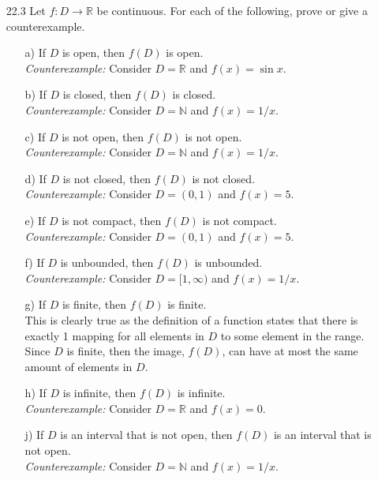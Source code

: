 \documentclass[12pt]{article}
\begin{document}
\begin{enumerate}
\item[22.3] Let $f: D \rightarrow \mathbb{R}$ be continuous. For each of the following, prove or give a counterexample.
\begin{enumerate}
\item[a)] If $D$ is open, then $f(D)$ is open. \\
\emph{Counterexample:} Consider $D = \mathbb{R}$ and $f(x) = \sin x$.
\item[b)] If $D$ is closed, then $f(D)$ is closed. \\
\emph{Counterexample:} Consider $D = \mathbb{N}$ and $f(x) = 1/x$.
\item[c)] If $D$ is not open, then $f(D)$ is not open. \\
\emph{Counterexample:} Consider $D = \mathbb{N}$ and $f(x) = 1/x$.
\item[d)] If $D$ is not closed, then $f(D)$ is not closed. \\
\emph{Counterexample:} Consider $D = (0, 1)$ and $f(x) = 5$.
\item[e)] If $D$ is not compact, then $f(D)$ is not compact. \\
\emph{Counterexample:} Consider $D = (0, 1)$ and $f(x) = 5$.
\item[f)] If $D$ is unbounded, then $f(D)$ is unbounded. \\
\emph{Counterexample:} Consider $D = [1, \infty)$ and $f(x) = 1/x$.
\item[g)] If $D$ is finite, then $f(D)$ is finite. \\
This is clearly true as the definition of a function states that
there is exactly 1 mapping for all elements in $D$ 
to some element in the range. Since $D$ is finite, then the 
image, $f(D)$, can have at most the same amount of elements in $D$.
\item[h)] If $D$ is infinite, then $f(D)$ is infinite. \\
\emph{Counterexample:} Consider $D = \mathbb{R}$ and $f(x) = 0$.
\item[j)] If $D$ is an interval that is not open, then $f(D)$ is an interval that is not open. \\
\emph{Counterexample:} Consider $D = \mathbb{N}$ and $f(x) = 1/x$.
\end{enumerate}


\end{enumerate}
\end{document}

